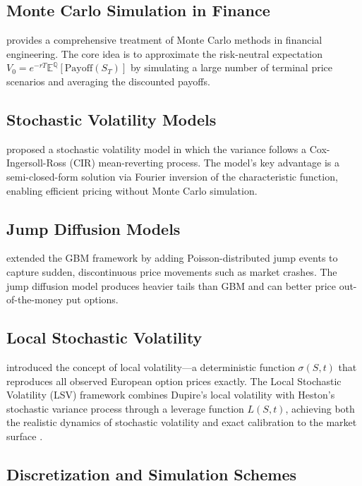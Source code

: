 \documentclass[12pt,a4paper]{article}
\begin{document}
\subsection{Monte Carlo Simulation in Finance}

\textcite{glasserman2003} provides a comprehensive treatment of Monte Carlo methods in financial engineering. The core idea is to approximate the risk-neutral expectation $V_0 = e^{-rT}\mathbb{E}^{\mathbb{Q}}[\text{Payoff}(S_T)]$ by simulating a large number of terminal price scenarios and averaging the discounted payoffs.

\subsection{Stochastic Volatility Models}

\textcite{heston1993} proposed a stochastic volatility model in which the variance follows a Cox-Ingersoll-Ross (CIR) mean-reverting process. The model's key advantage is a semi-closed-form solution via Fourier inversion of the characteristic function, enabling efficient pricing without Monte Carlo simulation.

\subsection{Jump Diffusion Models}

\textcite{merton1976} extended the GBM framework by adding Poisson-distributed jump events to capture sudden, discontinuous price movements such as market crashes. The jump diffusion model produces heavier tails than GBM and can better price out-of-the-money put options.

\subsection{Local Stochastic Volatility}

\textcite{dupire1994} introduced the concept of local volatility---a deterministic function $\sigma(S, t)$ that reproduces all observed European option prices exactly. The Local Stochastic Volatility (LSV) framework combines Dupire's local volatility with Heston's stochastic variance process through a leverage function $L(S, t)$, achieving both the realistic dynamics of stochastic volatility and exact calibration to the market surface \parencite{gatheral2006}.

\subsection{Discretization and Simulation Schemes}
\end{document}
